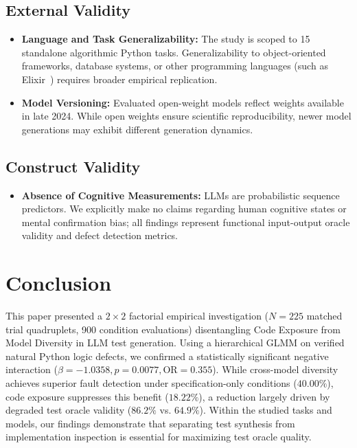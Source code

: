 \documentclass[11pt,a4paper]{article}
\begin{document}
\subsection{External Validity}
\begin{itemize}
    \item \textbf{Language and Task Generalizability:} The study is scoped to 15 standalone algorithmic Python tasks. Generalizability to object-oriented frameworks, database systems, or other programming languages (such as Elixir~\cite{leu2026modeldiversity}) requires broader empirical replication.
    \item \textbf{Model Versioning:} Evaluated open-weight models reflect weights available in late 2024. While open weights ensure scientific reproducibility, newer model generations may exhibit different generation dynamics.
\end{itemize}

\subsection{Construct Validity}
\begin{itemize}
    \item \textbf{Absence of Cognitive Measurements:} LLMs are probabilistic sequence predictors. We explicitly make no claims regarding human cognitive states or mental confirmation bias; all findings represent functional input-output oracle validity and defect detection metrics.
\end{itemize}

\section{Conclusion}
\label{sec:conclusion}

This paper presented a $2 \times 2$ factorial empirical investigation ($N=225$ matched trial quadruplets, 900 condition evaluations) disentangling Code Exposure from Model Diversity in LLM test generation. 
Using a hierarchical GLMM on verified natural Python logic defects, we confirmed a statistically significant negative interaction ($\beta = -1.0358, p = 0.0077, \text{OR} = 0.355$). 
While cross-model diversity achieves superior fault detection under specification-only conditions ($40.00\%$), code exposure suppresses this benefit ($18.22\%$), a reduction largely driven by degraded test oracle validity ($86.2\%$ vs. $64.9\%$). 
Within the studied tasks and models, our findings demonstrate that separating test synthesis from implementation inspection is essential for maximizing test oracle quality.
\end{document}
